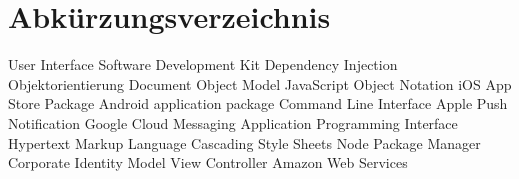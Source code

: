 
\chapter*{Abkürzungsverzeichnis}

\begin{acronym}
  {User Interface}
  {Software Development Kit}
  {Dependency Injection}
   {Objektorientierung}
   {Document Object Model}
   {JavaScript Object Notation}
   {iOS App Store Package}
   {Android application package}
   {Command Line Interface}
   {Apple Push Notification}
   {Google Cloud Messaging}
   {Application Programming Interface}
   {Hypertext Markup Language}
   {Cascading Style Sheets}
   {Node Package Manager}
   {Corporate Identity}
   {Model View Controller}
   {Amazon Web Services}
\end{acronym}
